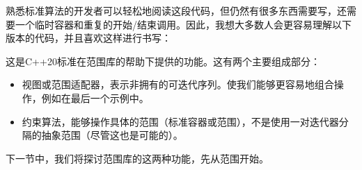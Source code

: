 熟悉标准算法的开发者可以轻松地阅读这段代码，但仍然有很多东西需要写，还需要一个临时容器和重复的开始/结束调用。因此，我想大多数人会更容易理解以下版本的代码，并且喜欢这样进行书写：


这是C++20标准在范围库的帮助下提供的功能。这有两个主要组成部分：

\begin{itemize}
\item
视图或范围适配器，表示非拥有的可迭代序列。使我们能够更容易地组合操作，例如在最后一个示例中。

\item
约束算法，能够操作具体的范围（标准容器或范围），不是使用一对迭代器分隔的抽象范围（尽管这也是可能的）。
\end{itemize}

下一节中，我们将探讨范围库的这两种功能，先从范围开始。

